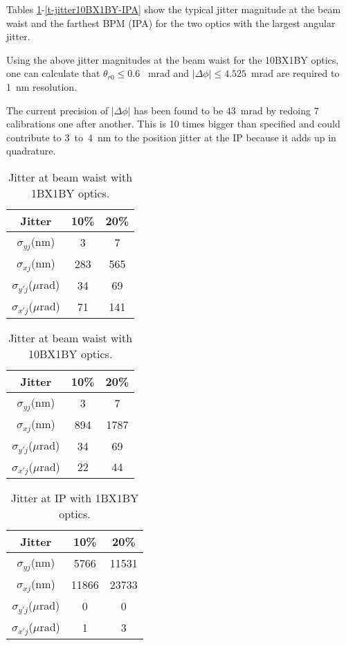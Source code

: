Tables \ref{t-jitter1BX1BY}-\ref{t-jitter10BX1BY-IPA} show the typical jitter magnitude at the beam waist and the farthest BPM (IPA) for the two optics with the largest angular jitter.\par
Using the above jitter magnitudes at the beam waist for the 10BX1BY optics, one can calculate that $\theta_{r0}\leq 0.6$~
mrad and $|\Delta\phi|\leq 4.525$~mrad are required to 1~nm resolution.\par
The current precision of $|\Delta\phi|$ has been found to be 43~mrad by redoing 7 calibrations one after another. This is 10 times bigger than specified and could contribute to 3~to~4~nm to the position jitter at the IP because it adds up in quadrature.
\begin{table}[h]
\centering
 \begin{tabular}{|c|c|c|}\hline	
 Jitter &10\% & 20\%\\\hline
 $\sigma_{yj}$(nm) & 3  & 7\\\hline
 $\sigma_{xj}$(nm) &283&565 \\\hline
 $\sigma_{y'j}$($\mu$rad) &34&69\\\hline
 $\sigma_{x'j}$($\mu$rad) &71&141\\\hline
 \end{tabular}
 \caption{Jitter at beam waist with 1BX1BY optics.}\label{t-jitter1BX1BY}
\end{table}
\begin{table}[h]
\centering
 \begin{tabular}{|c|c|c|}\hline
 Jitter &10\% & 20\%\\\hline
 $\sigma_{yj}$(nm) & 3  & 7\\\hline
 $\sigma_{xj}$(nm) &894&1787 \\\hline
 $\sigma_{y'j}$($\mu$rad) &34&69\\\hline
 $\sigma_{x'j}$($\mu$rad) &22&44\\\hline
 \end{tabular}
 \caption{Jitter at beam waist with 10BX1BY optics.}\label{t-jitter10BX1BY}
\end{table}
\begin{table}[t]
\centering
 \begin{tabular}{|c|c|c|}\hline
 Jitter &10\% & 20\%\\\hline
 $\sigma_{yj}$(nm) & 5766  &11531\\\hline
 $\sigma_{xj}$(nm) &11866&23733 \\\hline
 $\sigma_{y'j}$($\mu$rad) &0&0\\\hline
 $\sigma_{x'j}$($\mu$rad) &1&3\\\hline
 \end{tabular}
 \caption{Jitter at IP with 1BX1BY optics.}\label{t-jitter1BX1BY-IPA}
\end{table}
